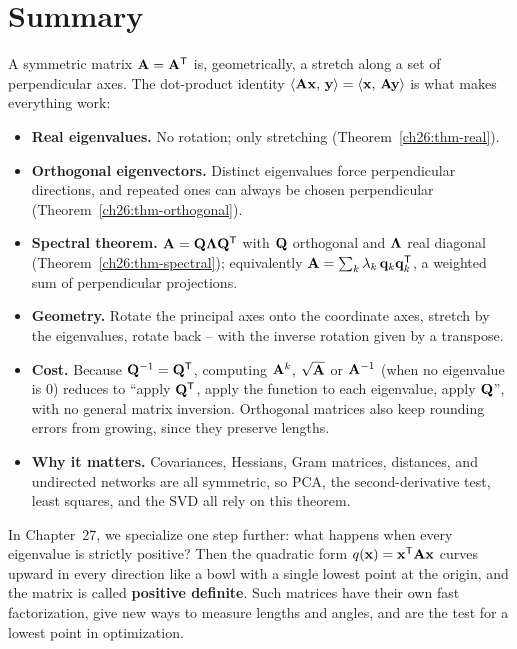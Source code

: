 \section{Summary}
\label{ch26:summary}

A symmetric matrix $\mathbf{A}=\mathbf{A}^{\mathsf{T}}$ is, geometrically, a stretch
along a set of perpendicular axes. The dot-product identity
$\langle \mathbf{A}\mathbf{x},\, \mathbf{y} \rangle=\langle \mathbf{x},\, \mathbf{A}\mathbf{y} \rangle$ is what makes
everything work:

\begin{itemize}
  \item \textbf{Real eigenvalues.} No rotation; only stretching
        (Theorem~\ref{ch26:thm-real}).
  \item \textbf{Orthogonal eigenvectors.} Distinct eigenvalues force perpendicular
        directions, and repeated ones can always be chosen perpendicular
        (Theorem~\ref{ch26:thm-orthogonal}).
  \item \textbf{Spectral theorem.} $\mathbf{A}=\mathbf{Q}\mathbf{\Lambda}\mathbf{Q}^{\mathsf{T}}$ with
        $\mathbf{Q}$ orthogonal and $\mathbf{\Lambda}$ real diagonal
        (Theorem~\ref{ch26:thm-spectral}); equivalently
        $\mathbf{A}=\sum_k \lambda_k\,\mathbf{q}_k\mathbf{q}_k^{\mathsf{T}}$, a weighted sum of
        perpendicular projections.
  \item \textbf{Geometry.} Rotate the principal axes onto the coordinate axes,
        stretch by the eigenvalues, rotate back -- with the inverse rotation
        given by a transpose.
  \item \textbf{Cost.} Because $\mathbf{Q}^{-1}=\mathbf{Q}^{\mathsf{T}}$, computing $\mathbf{A}^k$,
        $\sqrt{\mathbf{A}}$ or $\mathbf{A}^{-1}$ (when no eigenvalue is $0$) reduces to
        ``apply $\mathbf{Q}^{\mathsf{T}}$, apply the function to each eigenvalue, apply
        $\mathbf{Q}$'', with no general matrix inversion. Orthogonal matrices also
        keep rounding errors from growing, since they preserve lengths.
  \item \textbf{Why it matters.} Covariances, Hessians, Gram matrices, distances,
        and undirected networks are all symmetric, so PCA, the second-derivative
        test, least squares, and the SVD all rely on this theorem.
\end{itemize}

In Chapter~27, we specialize one step further: what happens when every
eigenvalue is strictly positive? Then the quadratic form
$q(\mathbf{x}) = \mathbf{x}^{\mathsf{T}}\mathbf{A}\mathbf{x}$ curves upward in every direction like a
bowl with a single lowest point at the origin, and the matrix is called
\textbf{positive definite}. Such matrices have their own fast factorization,
give new ways to measure lengths and angles, and are the test for a lowest point
in optimization.

